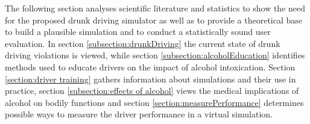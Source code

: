 The following section analyses scientific literature and statistics to show the need for the proposed drunk driving simulator as well as to provide a theoretical base to build a plausible simulation and to conduct a statistically sound user evaluation.
In section \ref{subsection:drunkDriving} the current state of drunk driving violations is viewed, while section \ref{subsection:alcoholEducation} identifies methods used to educate drivers on the impact of alcohol intoxication.
Section \ref{section:driver training} gathers information about simulations and their use in practice, section \ref{subsection:effects of alcohol} views the medical implications of alcohol on bodily functions and section \ref{section:measurePerformance} determines possible ways to measure the driver performance in a virtual simulation.


%
